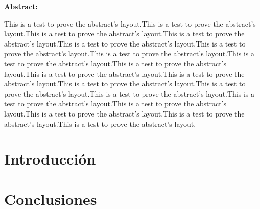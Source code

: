 \documentclass[11pt, a4paper]{article} %
\begin{document}
{\bfseries \large Abstract: }\vspace{5mm} 

This is a test to prove the abstract's layout.This is a test to prove the abstract's layout.This is a test to prove the abstract's layout.This is a test to prove the abstract's layout.This is a test to prove the abstract's layout.This is a test to prove the abstract's layout.This is a test to prove the abstract's layout.This is a test to prove the abstract's layout.This is a test to prove the abstract's layout.This is a test to prove the abstract's layout.This is a test to prove the abstract's layout.This is a test to prove the abstract's layout.This is a test to prove the abstract's layout.This is a test to prove the abstract's layout.This is a test to prove the abstract's layout.This is a test to prove the abstract's layout.This is a test to prove the abstract's layout.This is a test to prove the abstract's layout.This is a test to prove the abstract's layout.
\vspace{1cm}


\newpage

\tableofcontents


\section{Introducción}

\section{Conclusiones}

\end{document}
